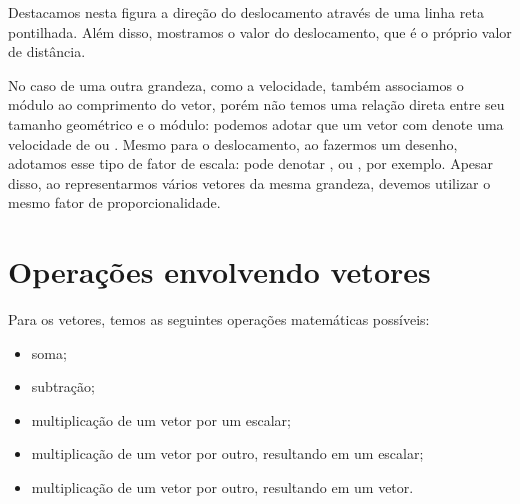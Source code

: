 \begin{marginfigure}
\centering
{}
\caption{Destacamos nesta figura a direção do deslocamento através de uma linha reta pontilhada. Além disso, mostramos o valor do deslocamento, que é o próprio valor de distância.}
\end{marginfigure}

No caso de uma outra grandeza, como a velocidade, também associamos o módulo ao comprimento do vetor, porém não temos uma relação direta entre seu tamanho geométrico e o módulo: podemos adotar que um vetor com  denote uma velocidade de  ou . Mesmo para o deslocamento, ao fazermos um desenho, adotamos esse tipo de fator de escala:  pode denotar , ou , por exemplo. Apesar disso, ao representarmos vários vetores da mesma grandeza, devemos utilizar o mesmo fator de proporcionalidade.

\section{Operações envolvendo vetores}

Para os vetores, temos as seguintes operações matemáticas possíveis:
\begin{itemize}
    \item soma;
    \item subtração;
    \item multiplicação de um vetor por um escalar;
    \item multiplicação de um vetor por outro, resultando em um escalar;
    \item multiplicação de um vetor por outro, resultando em um vetor.
\end{itemize}

